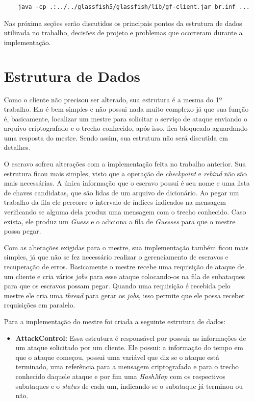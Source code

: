 \documentclass[
	12pt,				%
    oneside,			%
	a4paper,			%
	english,			%
	brazil,				%
	]{abntex2}
\begin{document}
\begin{lstlisting}
	java -cp .:../../glassfish5/glassfish/lib/gf-client.jar br.inf ...
\end{lstlisting}

Nas próxima seções serão discutidos os principais pontos da estrutura de dados utilizada no trabalho, decisões de projeto e 
problemas que ocorreram durante a implementação.

\section{Estrutura de Dados}

Como o cliente não precisou ser alterado, sua estrutura é a mesma do 1º trabalho. Ela é bem simples e não possui nada muito complexo já que sua função é, basicamente, localizar um mestre para solicitar o serviço de ataque enviando o arquivo criptografado e o trecho conhecido, após isso, fica bloqueado aguardando uma resposta do mestre. Sendo assim, sua estrutura não será discutida em detalhes.

O escravo sofreu alterações com a implementação feita no trabalho anterior. Sua estrutura ficou mais simples, visto que a operação de \textit{checkpoint} e \textit{rebind} não são mais necessárias. A única informação que o escravo possui é seu nome  e uma lista de chaves candidatas, que são lidas de um arquivo de dicionário. Ao pegar um trabalho da fila ele percorre o intervalo de índices indicados na mensagem verificando se alguma dela produz uma mensagem com o trecho conhecido. Caso exista, ele produz um \textit{Guess} e o adiciona a fila de \textit{Guesses} para que o mestre possa pegar.

Com as alterações exigidas para o mestre, sua implementação também ficou mais simples, já que não se fez necessário realizar o gerenciamento de escravos e recuperação de erros. Basicamente o mestre recebe uma requisição de ataque de um cliente e cria vários \textit{jobs} para esse ataque colocando-os na fila de subataques para que os escravos possam pegar. Quando uma requisição é recebida pelo mestre ele cria uma \textit{thread} para gerar os \textit{jobs}, isso permite que ele possa receber requisições em paralelo.

Para a implementação do mestre foi criada a seguinte estrutura de dados:

\begin{itemize}

	\item \textbf{AttackControl:} Essa estrutura é responsável por possuir as informações de um ataque solicitado por um
	cliente. Ele possui: a informação do tempo em que o ataque começou, possui uma variável que diz se o ataque está 
	terminado, uma referência para a mensagem criptografada e para o trecho conhecido daquele ataque e por fim uma 
	\textit{HashMap} com os respectivos subataques e o \textit{status} de cada um, indicando se o subataque já terminou ou 
	não.
	
\end{itemize}
\end{document}
